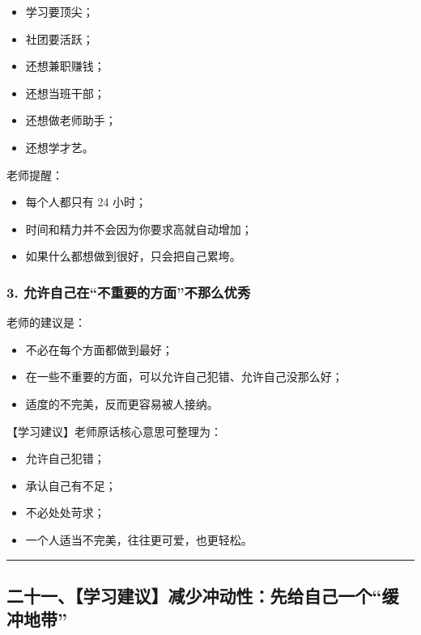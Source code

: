\documentclass[
  chinese,
  9pt,
  a4paper,
]{ctexart}
\providecommand{\tightlist}{%
  \setlength{\itemsep}{0pt}\setlength{\parskip}{0pt}}
\begin{document}
\begin{itemize}
\tightlist
\item
  学习要顶尖；
\item
  社团要活跃；
\item
  还想兼职赚钱；
\item
  还想当班干部；
\item
  还想做老师助手；
\item
  还想学才艺。
\end{itemize}

老师提醒：

\begin{itemize}
\tightlist
\item
  每个人都只有 24 小时；
\item
  时间和精力并不会因为你要求高就自动增加；
\item
  如果什么都想做到很好，只会把自己累垮。
\end{itemize}

\subsubsection{3.
允许自己在``不重要的方面''不那么优秀}\label{ux5141ux8bb8ux81eaux5df1ux5728ux4e0dux91cdux8981ux7684ux65b9ux9762ux4e0dux90a3ux4e48ux4f18ux79c0}

老师的建议是：

\begin{itemize}
\tightlist
\item
  不必在每个方面都做到最好；
\item
  在一些不重要的方面，可以允许自己犯错、允许自己没那么好；
\item
  适度的不完美，反而更容易被人接纳。
\end{itemize}

【学习建议】老师原话核心意思可整理为：

\begin{itemize}
\tightlist
\item
  允许自己犯错；
\item
  承认自己有不足；
\item
  不必处处苛求；
\item
  一个人适当不完美，往往更可爱，也更轻松。
\end{itemize}

\begin{center}\rule{0.5\linewidth}{0.5pt}\end{center}

\subsection{二十一、【学习建议】减少冲动性：先给自己一个``缓冲地带''}\label{ux4e8cux5341ux4e00ux5b66ux4e60ux5efaux8baeux51cfux5c11ux51b2ux52a8ux6027ux5148ux7ed9ux81eaux5df1ux4e00ux4e2aux7f13ux51b2ux5730ux5e26}
\end{document}
